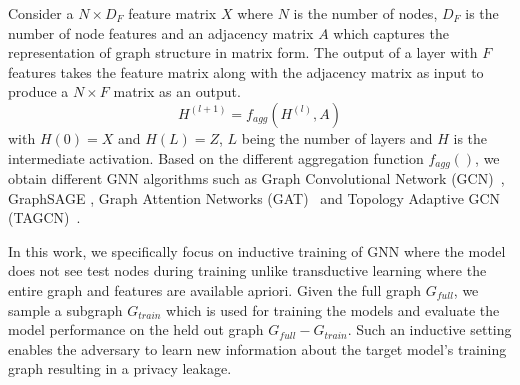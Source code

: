 Consider a $N\times D_F$ feature matrix $X$ where $N$ is the number of nodes, $D_F$ is the number of node features and an adjacency matrix $A$ which captures the representation of graph structure in matrix form.
The output of a layer with $F$ features takes the feature matrix along with the adjacency matrix as input to produce a $N\times F$ matrix as an output.
\begin{equation}
H^{(l+1)} = f_{agg}(H^{(l)}, A)
\end{equation}
with $H(0)=X$ and $H(L)=Z$, $L$ being the number of layers and $H$ is the intermediate activation.
Based on the different aggregation function $f_{agg}()$, we obtain different GNN algorithms such as Graph Convolutional Network (GCN)~\cite{Kipf2016tc}, GraphSAGE \cite{NIPS20176703}, Graph Attention Networks (GAT)~\cite{velickovic2018graph} and Topology Adaptive GCN (TAGCN)~\cite{du2018topology}.


In this work, we specifically focus on inductive training of GNN where the model does not see test nodes during training unlike transductive learning where the entire graph and features are available apriori.
Given the full graph $G_{full}$, we sample a subgraph $G_{train}$ which is used for training the models and evaluate the model performance on the held out graph $G_{full}-G_{train}$.
Such an inductive setting enables the adversary to learn new information about the target model's training graph resulting in a privacy leakage.
